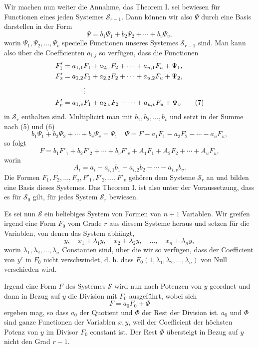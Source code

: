\documentclass[11pt]{article}
\begin{document}
Wir machen nun weiter die Annahme, das Theorem I. sei bewiesen für Functionen eines jeden Systemes $\mathcal S_{r-1}$. Dann können wir also $\Psi$ durch eine Basis darstellen in der Form
\begin{equation}
\Psi=b_1\Psi_1+b_2\Psi_2+\cdots+b_v\Psi_v,
\tag{6}
\end{equation}
worin $\Psi_1,\Psi_2,\ldots,\Psi_v$ specielle Functionen unseres Systemes $\mathcal S_{r-1}$ sind. Man kann also über die Coefficienten $a_{i,j}$ so verfügen, dass die Functionen
\begin{align}
F'_1&=a_{1,1}F_1+a_{2,1}F_2+\cdots+a_{u,1}F_u+\Psi_1,\notag\\
F'_2&=a_{1,2}F_1+a_{2,2}F_2+\cdots+a_{u,2}F_u+\Psi_2,\notag\\
&\hspace{3em}\vdots\notag\\
F'_v&=a_{1,v}F_1+a_{2,v}F_2+\cdots+a_{u,v}F_u+\Psi_v
\tag{7}
\end{align}
in $\mathcal S_r$ enthalten sind. Multiplicirt man mit $b_1,b_2,\ldots,b_v$ und setzt in der Summe nach (5) und (6)
\[
b_1\Psi_1+b_2\Psi_2+\cdots+b_v\Psi_v=\Psi,
\quad
\Psi=F-a_1F_1-a_2F_2-\cdots-a_uF_u,
\]
so folgt
\begin{equation}
F=b_1F'_1+b_2F'_2+\cdots+b_vF'_v+A_1F_1+A_2F_2+\cdots+A_uF_u,
\tag{8}
\end{equation}
worin
\begin{equation}
A_i=a_i-a_{i,1}b_1-a_{i,2}b_2-\cdots-a_{i,v}b_v.
\tag{9}
\end{equation}
Die Formen $F_1,F_2,\ldots,F_u,F'_1,F'_2,\ldots,F'_v$ gehören dem Systeme $\mathcal S_r$ an und bilden eine Basis dieses Systemes. Das Theorem I. ist also unter der Voraussetzung, dass es für $\mathcal S_0$ gilt, für jedes System $\mathcal S_r$ bewiesen.

Es sei nun $\mathcal S$ ein beliebiges System von Formen von $n+1$ Variablen. Wir greifen irgend eine Form $F_0$ vom Grade $r$ aus diesem Systeme heraus und setzen für die Variablen, von denen das System abhängt,
\begin{equation}
y,
\quad x_1+\lambda_1y,
\quad x_2+\lambda_2y,
\quad\ldots,
\quad x_n+\lambda_ny,
\tag{10}
\end{equation}
worin $\lambda_1,\lambda_2,\ldots,\lambda_n$ Constanten sind, über die wir so verfügen, dass der Coefficient von $y^r$ in $F_0$ nicht verschwindet, d. h. dass $F_0(1,\lambda_1,\lambda_2,\ldots,\lambda_n)$ von Null verschieden wird.

Irgend eine Form $F$ des Systemes $\mathcal S$ wird nun nach Potenzen von $y$ geordnet und dann in Bezug auf $y$ die Division mit $F_0$ ausgeführt, wobei sich
\begin{equation}
F=a_0F_0+\Phi
\tag{11}
\end{equation}
ergeben mag, so dass $a_0$ der Quotient und $\Phi$ der Rest der Division ist. $a_0$ und $\Phi$ sind ganze Functionen der Variablen $x,y$, weil der Coefficient der höchsten Potenz von $y$ im Divisor $F_0$ constant ist. Der Rest $\Phi$ übersteigt in Bezug auf $y$ nicht den Grad $r-1$.
\end{document}
